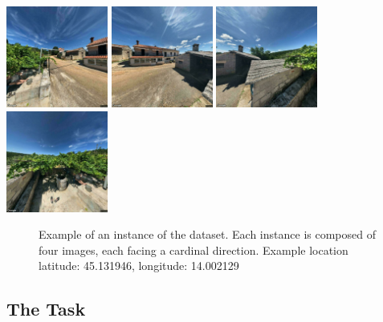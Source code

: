 \documentclass[]{article}
\begin{document}
\includegraphics[width=0.25\textwidth,height=\textheight]{./tex2pdf.-3ffa51a14b505aec/49f237142aed59083ad2e7e818add3dc69d2d5a4.jpg}
\includegraphics[width=0.25\textwidth,height=\textheight]{./tex2pdf.-3ffa51a14b505aec/696d6677da6419c8444d5f98c8cdd0d3b88a9557.jpg}
\includegraphics[width=0.25\textwidth,height=\textheight]{./tex2pdf.-3ffa51a14b505aec/4e3fc1054d52b1bf24d198cd920509226991c69d.jpg}
\includegraphics[width=0.25\textwidth,height=\textheight]{./tex2pdf.-3ffa51a14b505aec/e4b6998093d11bc9c9179acea3ad1fb2ed7cfdd4.jpg}

\begin{figure}[!h]
\caption{Example of an instance of the dataset. Each instance is composed of four images, each facing a cardinal direction. Example location latitude: 45.131946, longitude: 14.002129}
\end{figure}

\hypertarget{the-task}{%
\subsection{The Task}\label{the-task}}
\end{document}
